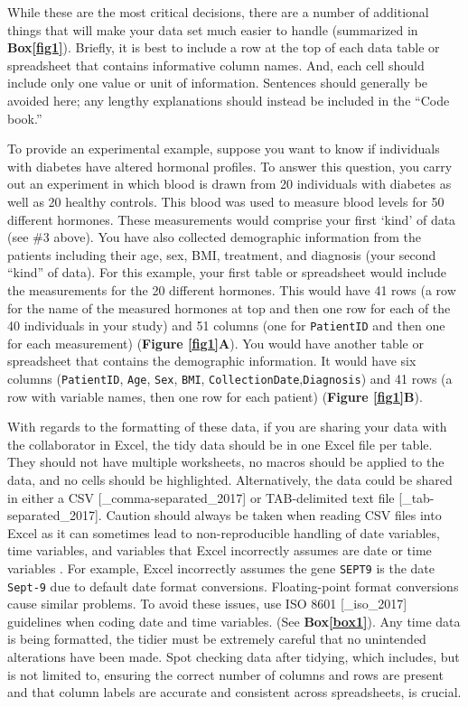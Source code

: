 \documentclass[12pt]{article}
\begin{document}
While these are the most critical decisions, there are a number of
additional things that will make your data set much easier to handle
\citep{_data_org} (summarized in \textbf{Box\ref{fig1}}). Briefly, it is
best to include a row at the top of each data table or spreadsheet that
contains informative column names. And, each cell should include only
one value or unit of information. Sentences should generally be avoided
here; any lengthy explanations should instead be included in the ``Code
book.''

To provide an experimental example, suppose you want to know if
individuals with diabetes have altered hormonal profiles. To answer this
question, you carry out an experiment in which blood is drawn from 20
individuals with diabetes as well as 20 healthy controls. This blood was
used to measure blood levels for 50 different hormones. These
measurements would comprise your first `kind' of data (see \#3 above).
You have also collected demographic information from the patients
including their age, sex, BMI, treatment, and diagnosis (your second
``kind'' of data). For this example, your first table or spreadsheet
would include the measurements for the 20 different hormones. This would
have 41 rows (a row for the name of the measured hormones at top and
then one row for each of the 40 individuals in your study) and 51
columns (one for \texttt{PatientID} and then one for each measurement)
(\textbf{Figure \ref{fig1}A}). You would have another table or
spreadsheet that contains the demographic information. It would have six
columns (\texttt{PatientID}, \texttt{Age}, \texttt{Sex}, \texttt{BMI},
\texttt{CollectionDate},\texttt{Diagnosis}) and 41 rows (a row with
variable names, then one row for each patient) (\textbf{Figure
\ref{fig1}B}).

With regards to the formatting of these data, if you are sharing your
data with the collaborator in Excel, the tidy data should be in one
Excel file per table. They should not have multiple worksheets, no
macros should be applied to the data, and no cells should be
highlighted. Alternatively, the data could be shared in either a CSV
{[}\_comma-separated\_2017{]} or TAB-delimited text file
{[}\_tab-separated\_2017{]}. Caution should always be taken when reading
CSV files into Excel as it can sometimes lead to non-reproducible
handling of date variables, time variables, and variables that Excel
incorrectly assumes are date or time variables
\citep{zeeberg_mistaken_2004}. For example, Excel incorrectly assumes
the gene \texttt{SEPT9} is the date \texttt{Sept-9} due to default date
format conversions. Floating-point format conversions cause similar
problems. To avoid these issues, use ISO 8601 {[}\_iso\_2017{]}
guidelines when coding date and time variables. (See
\textbf{Box\ref{box1}}). Any time data is being formatted, the tidier
must be extremely careful that no unintended alterations have been made.
Spot checking data after tidying, which includes, but is not limited to,
ensuring the correct number of columns and rows are present and that
column labels are accurate and consistent across spreadsheets, is
crucial.
\end{document}

